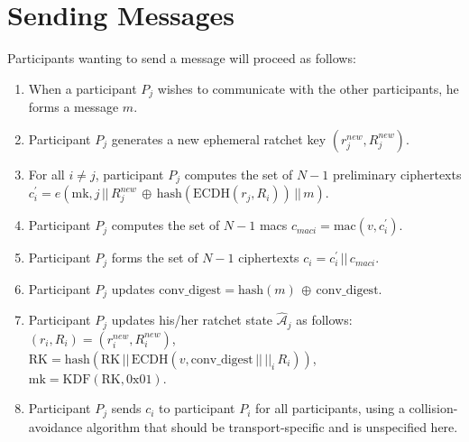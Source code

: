 \documentclass[%
preprint,
amsmath,amssymb,
aps,
prb,
floatfix,
]{revtex4-1}
\begin{document}
\section{\label{sec:sending}Sending Messages}
Participants wanting to send a message will proceed as follows:
\begin{enumerate}
\item When a participant $P_j$ wishes to communicate with the other
participants, he forms a message $m$.
\item Participant $P_j$ generates a new ephemeral ratchet key
$(r_j^{new},R_j^{new})$.
\item For all $i \ne j$, participant $P_j$ computes the set of $N-1$ preliminary
ciphertexts $c_{i}^\prime = e(\mathrm{mk}, j
\, || \, R_j^{new} \, \oplus \, \mathrm{hash}(\mathrm{ECDH}(r_j, R_i)) \, || \, m)$.
\item Participant $P_j$ computes the set of $N-1$ macs $c_{maci} =
\mathrm{mac}(v, c_i^\prime)$.
\item Participant $P_j$ forms the set of $N-1$ ciphertexts $c_i = c_i^\prime \, || \, c_{maci}$.
\item Participant $P_j$ updates $\mathrm{conv\_digest} = \mathrm{hash}(m) \, \oplus \, \mathrm{conv\_digest}$.
\item Participant $P_j$ updates his/her ratchet state $\mathcal{\hat{A}}_j$ as
follows:\\
$(r_i, R_i) = (r_i^{new}, R_i^{new})$, \\
$\mathrm{RK} = \mathrm{hash}(\mathrm{RK} \, || \, \mathrm{ECDH}(v,
\mathrm{conv\_digest} \, || \, ||_i \, R_i))$, \\
$\mathrm{mk} = \mathrm{KDF}(\mathrm{RK}, 0\mathrm{x}01)$.
\item Participant $P_j$ sends $c_i $ to participant $P_i$ for all participants,
using a collision-avoidance algorithm that should be transport-specific and is
unspecified here.
\end{enumerate}
\end{document}

